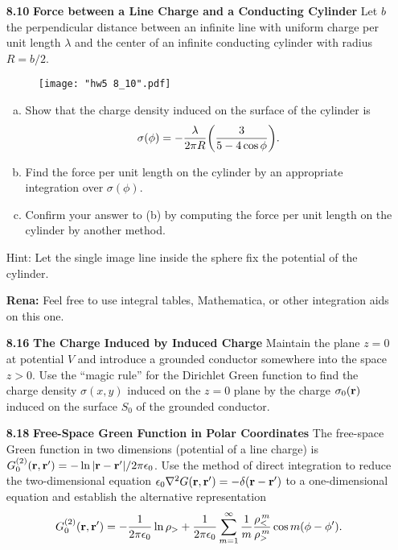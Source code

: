 \documentclass{article}
\begin{document}
\begin{enumerate}
    \item [\textbf{8.10}] \textbf{Force between a Line Charge and a Conducting Cylinder } Let $b$ the perpendicular distance between an infinite line with uniform charge per unit length $\lambda$ and the center of an infinite conducting cylinder with radius $R = b/2$.
    \begin{figure}[H]
    \centering
    \texttt{[image: "hw5 8\_10".pdf]}
    \end{figure}
    \begin{enumerate}[(a)]
        \item Show that the charge density induced on the surface of the cylinder is
        \[
            \sigma(\phi) = -\frac{\lambda}{2\pi R}\pqty{\frac{3}{5-4\cos\phi}}.
        \]

        \item Find the force per unit length on the cylinder by an appropriate integration over $\sigma(\phi)$.

        \item Confirm your answer to (b) by computing the force per unit length on the cylinder by another method.
    \end{enumerate}
    Hint: Let the single image line inside the sphere fix the potential of the cylinder.

    \textbf{Rena:} Feel free to use integral tables, Mathematica, or other integration aids on this one.

    \item [\textbf{8.16}] \textbf{The Charge Induced by Induced Charge } Maintain the plane $z=0$ at potential $V$ and introduce a grounded conductor somewhere into the space $z>0$. Use the ``magic rule'' for the Dirichlet Green function to find the charge density $\sigma(x,y)$ induced on the $z=0$ plane by the charge $\sigma_0(\vb{r})$ induced on the surface $S_0$ of the grounded conductor.

    \item [\textbf{8.18}] \textbf{Free-Space Green Function in Polar Coordinates } The free-space Green function in two dimensions (potential of a line charge) is $G_0^{(2)}(\vb{r},\vb{r'}) = -\ln \abs{\vb{r}-\vb{r'}}/2\pi\epsilon_0$. Use the method of direct integration to reduce the two-dimensional equation $\epsilon_0\laplacian{G}(\vb{r},\vb{r'}) = -\delta\pqty{\vb{r}-\vb{r'}}$ to a one-dimensional equation and establish the alternative representation
    \[
        G_0^{(2)}(\vb{r},\vb{r'}) = -\frac{1}{2\pi\epsilon_0}\ln\rho_> + \frac{1}{2\pi\epsilon_0}\sum_{m=1}^\infty \frac{1}{m} \frac{\rho_<^{\,m}}{\rho_>^{\,m}}\cos m\pqty{\phi - \phi'}.
    \]


\end{enumerate}
\end{document}
